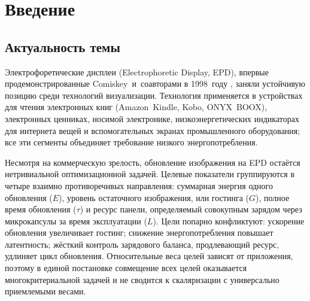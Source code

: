 \chapter{Введение}\label{ch:intro}

\section*{Актуальность темы}

Электрофоретические дисплеи (Electrophoretic Display, EPD), впервые
продемонстрированные Comiskey~и~соавторами в 1998~году
\cite{comiskey1998_nature}, заняли устойчивую позицию среди технологий
визуализации. Технология применяется в устройствах для чтения электронных книг
(Amazon~Kindle, Kobo, ONYX~BOOX), электронных ценниках, носимой электронике,
низкоэнергетических индикаторах для интернета вещей и вспомогательных экранах
промышленного оборудования; все эти сегменты объединяет требование низкого
энергопотребления.

Несмотря на коммерческую зрелость, обновление изображения на EPD остаётся
нетривиальной оптимизационной задачей. Целевые показатели группируются в
четыре взаимно противоречивых направления: суммарная энергия одного
обновления ($E$), уровень остаточного изображения, или гостинга ($G$), полное
время обновления ($\tau$) и ресурс панели, определяемый совокупным зарядом
через микрокапсулы за время эксплуатации ($L$). Цели попарно
конфликтуют: ускорение обновления увеличивает гостинг;
снижение энергопотребления повышает латентность; жёсткий контроль зарядового
баланса, продлевающий ресурс, удлиняет цикл обновления. Относительные веса
целей зависят от приложения, поэтому в единой постановке совмещение всех целей
оказывается многокритериальной задачей и не сводится к скаляризации
с универсально приемлемыми весами.

